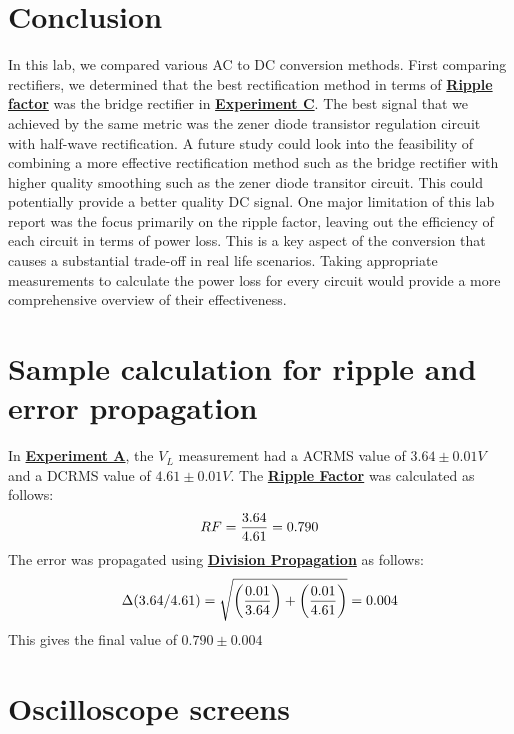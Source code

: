 \documentclass[
	letterpaper
	12pt
]{template}
\newcommand{\bref}[2]{\textbf{\hyperref[#1]{#2}}}
\begin{document}
\section{Conclusion}
In this lab, we compared various AC to DC conversion methods. First comparing rectifiers, we determined that the best rectification method in terms of \bref{eqn::ripple}{Ripple factor} was the bridge rectifier in \bref{method::C}{Experiment C}. The best signal that we achieved by the same metric was the zener diode transistor regulation circuit with half-wave rectification. A future study could look into the feasibility of combining a more effective rectification method such as the bridge rectifier with higher quality smoothing such as the zener diode transitor circuit. This could potentially provide a better quality DC signal. One major limitation of this lab report was the focus primarily on the ripple factor, leaving out the efficiency of each circuit in terms of power loss. This is a key aspect of the conversion that causes a substantial trade-off in real life scenarios. Taking appropriate measurements to calculate the power loss for every circuit would provide a more comprehensive overview of their effectiveness.
\newpage\appendix
\section{Sample calculation for ripple and error propagation}\label{appdx::A}
In \bref{method::A}{Experiment A}, the $V_L$ measurement had a ACRMS value of $3.64\pm 0.01V$ and a DCRMS value of $4.61\pm0.01V$. The \bref{eqn::ripple}{Ripple Factor} was calculated as follows:
\begin{align*}
	RF = {3.64\over 4.61} =  0.790
\end{align*}
The error was propagated using \bref{prop::div}{Division Propagation} as follows:
\begin{align*}
	\Delta (3.64/4.61) = \sqrt{ \left({0.01\over 3.64}\right) + \left({0.01\over 4.61}\right)}= 0.004
\end{align*}
This gives the final value of $0.790 \pm 0.004$
\section{Oscilloscope screens}
\end{document}
